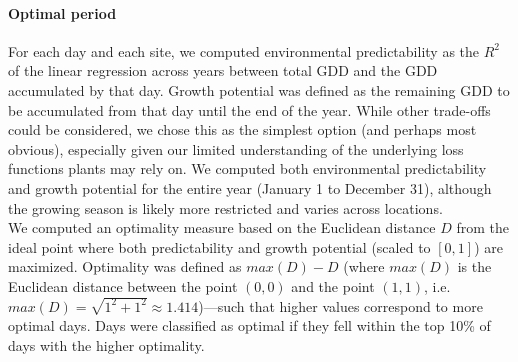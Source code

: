 \documentclass[11pt,letter]{article}
\begin{document}
\paragraph{Optimal period} For each day and each site, we computed environmental predictability as the $R^2$ of the linear regression across years between total GDD and the GDD accumulated by that day. Growth potential was defined as the remaining GDD to be accumulated from that day until the end of the year. While other trade-offs could be considered, we chose this as the simplest option (and perhaps most obvious), especially given our limited understanding of the underlying loss functions plants may rely on. We computed both environmental predictability and growth potential for the entire year (January 1 to December 31), although the growing season is likely more restricted and varies across locations. \\
We computed an optimality measure based on the Euclidean distance $D$ from  the ideal point where both predictability and growth potential (scaled to $[0,1]$) are maximized. Optimality was defined as $max(D)-D$ (where $max(D)$ is the Euclidean distance between the point $(0,0)$ and the point $(1,1)$, i.e. $max(D)=\sqrt{1^2+1^2}\approx1.414$)---such that higher values correspond to more optimal days. Days were classified as optimal if they fell within the top 10\% of days with the higher optimality.


{\footnotesize
\vspace*{0cm}
}
\end{document}
